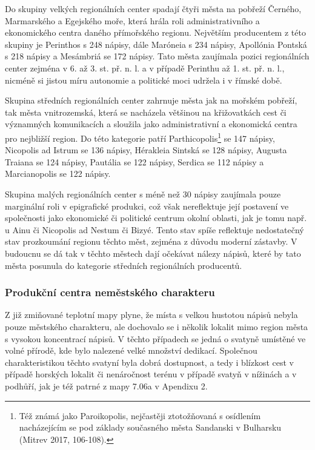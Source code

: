 Do skupiny velkých regionálních center spadají čtyři města na pobřeží Černého, Marmarského a Egejského moře, která hrála roli administrativního a ekonomického centra daného přímořského regionu. Největším producentem z této skupiny je Perinthos s 248 nápisy, dále Maróneia s 234 nápisy, Apollónia Pontská s 218 nápisy a Mesámbriá se 172 nápisy. Tato města zaujímala pozici regionálních center zejména v 6. až 3. st. př. n. l. a v případě Perinthu až 1. st. př. n. l., nicméně si jistou míru autonomie a politické moci udržela i v římské době.

Skupina středních regionálních center zahrnuje města jak na mořském pobřeží, tak města vnitrozemská, která se nacházela většinou na křižovatkách cest či významných komunikacích a sloužila jako administrativní a ekonomická centra pro nejbližší region. Do této kategorie patří Parthicopolis\footnote{Též známá jako Paroikopolis, nejčastěji ztotožňovaná s osídlením nacházejícím se pod základy současného města Sandanski v Bulharsku (Mitrev 2017, 106-108).} se 147 nápisy, Nicopolis ad Istrum se 136 nápisy, Hérakleia Sintská se 128 nápisy, Augusta Traiana se 124 nápisy, Pautália se 122 nápisy, Serdica se 112 nápisy a Marcianopolis se 122 nápisy.

Skupina malých regionálních center s méně než 30 nápisy zaujímala pouze marginální roli v epigrafické produkci, což však nereflektuje její postavení ve společnosti jako ekonomické či politické centrum okolní oblasti, jak je tomu např. u Ainu či Nicopolis ad Nestum či Bizyé. Tento stav spíše reflektuje nedostatečný stav prozkoumání regionu těchto měst, zejména z důvodu moderní zástavby. V budoucnu se dá tak v těchto městech dají očekávat nálezy nápisů, které by tato města posunula do kategorie středních regionálních producentů.

\subsubsection[produkční-centra-neměstského-charakteru]{Produkční centra neměstského charakteru}

Z již zmiňované teplotní mapy plyne, že místa s velkou hustotou nápisů nebyla pouze městského charakteru, ale dochovalo se i několik lokalit mimo region města s vysokou koncentrací nápisů. V těchto případech se jedná o svatyně umístěné ve volné přírodě, kde bylo nalezené velké množství dedikací. Společnou charakteristikou těchto svatyní byla dobrá dostupnost, a tedy i blízkost cest v případě horských lokalit či nenáročnost terénu v případě svatyň v nížinách a v podhůří, jak je též patrné z mapy 7.06a v Apendixu 2.

